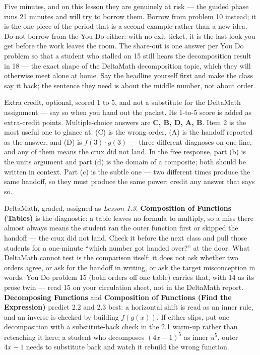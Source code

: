 \documentclass[10pt]{article}
\begin{document}
\begin{teachernote}[Debrief]
Five minutes, and on this lesson they are genuinely at risk --- the guided phase runs 21 minutes
and will try to borrow them. Borrow from problem 10 instead; it is the one piece of the period
that is a second example rather than a new idea. Do not borrow from the You Do either: with no
exit ticket, it is the last look you get before the work leaves the room. The share-out is one
answer per You Do problem so that a student who stalled on 15 still hears the decomposition result
in 18 --- the exact shape of the DeltaMath decomposition topic, which they will otherwise meet
alone at home. Say the headline yourself first and make the class say it back; the sentence
they need is about the middle number, not about order.
\end{teachernote}

\begin{teachernote}[AP Practice]
Extra credit, optional, scored 1 to 5, and not a substitute for the DeltaMath assignment --- say so when you hand
out the packet. Its 1-to-5 score is added as extra-credit points. Multiple-choice answers are \textbf{C, B, D, A, B}. Item 2 is the most useful
one to glance at: (C) is the wrong order, (A) is the handoff reported as the answer, and (D) is
$f(3) \cdot g(3)$ --- three different diagnoses on one line, and any of them means the crux did not
land. In the free response, part (b) is the units argument and part (d) is the domain of a
composite; both should be written in context. Part (c) is the subtle one --- two different times
produce the same handoff, so they must produce the same power; credit any answer that says so.
\end{teachernote}

\begin{teachernote}[Homework]
DeltaMath, graded, assigned as \textit{Lesson 1.3}. \textbf{Composition of Functions (Tables)} is
the diagnostic: a table leaves no formula to multiply, so a miss there almost always means the
student ran the outer function first or skipped the handoff --- the crux did not land. Check it
before the next class and pull those students for a one-minute ``which number got handed
over?'' at the door. What DeltaMath cannot test is the comparison itself: it does not ask whether
two orders agree, or ask for the handoff in writing, or ask the target misconception in words. You
Do problem 15 (both orders off one table) carries that, with 14 as its prose twin --- read 15 on
your circulation sheet, not in the DeltaMath report. \textbf{Decomposing Functions} and
\textbf{Composition of Functions (Find the Expression)} predict 2.2 and 2.3 best: a horizontal
shift is read as an inner rule, and an inverse is checked by building $f(g(x))$. If either slips,
put one decomposition with a substitute-back check in the 2.1 warm-up rather than reteaching it
here; a student who decomposes $(4x-1)^5$ as inner $u^5$, outer $4x-1$ needs to substitute back
and watch it rebuild the wrong function.
\end{teachernote}
\end{document}
